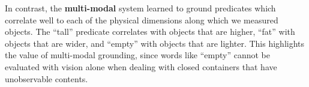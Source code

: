 In contrast, the \textbf{multi-modal} system learned to ground predicates which correlate well to each of the physical dimensions along which we measured objects.
The ``tall'' predicate correlates with objects that are higher, ``fat'' with objects that are wider, and ``empty'' with objects that are lighter.
This highlights the value of multi-modal grounding, since words like ``empty'' cannot be evaluated with vision alone when dealing with closed containers that have unobservable contents.
